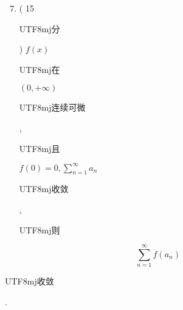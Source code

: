 \documentclass[10pt]{article}
\begin{document}
\begin{enumerate}
  \setcounter{enumi}{6}
  \item ( 15 \begin{CJK}{UTF8}{mj}分\end{CJK}) $f(x)$ \begin{CJK}{UTF8}{mj}在\end{CJK} $(0,+\infty)$ \begin{CJK}{UTF8}{mj}连续可微\end{CJK}, \begin{CJK}{UTF8}{mj}且\end{CJK} $f(0)=0, \sum_{n=1}^{\infty} a_{n}$ \begin{CJK}{UTF8}{mj}收敛\end{CJK}, \begin{CJK}{UTF8}{mj}则\end{CJK}
\end{enumerate}
$$
\sum_{n=1}^{\infty} f\left(a_{n}\right)
$$
\begin{CJK}{UTF8}{mj}收敛\end{CJK}.
\end{document}
